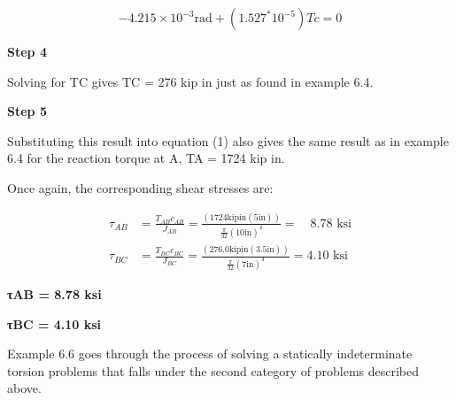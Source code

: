 \documentclass[
  letterpaper,
  DIV=11,
  numbers=noendperiod]{scrreprt}
\begin{document}
\begin{tcolorbox}
\begin{tcolorbox}
\[
-4.215 \times 10^{-3} \mathrm{rad}+(1.527^* 10^{-5}) T{c}=0
\]

\textbf{Step 4}

Solving for TC gives TC = 276 kip in just as found in example 6.4.

\textbf{Step 5}

Substituting this result into equation (1) also gives the same result as
in example 6.4 for the reaction torque at A, TA = 1724 kip in.

Once again, the corresponding shear stresses are:

\[
\begin{aligned}
\tau_{A B} & =\frac{T_{A B} c_{A B}}{J_{A B}}=\frac{(1724 \mathrm{kip} \mathrm{in}(5 \mathrm{in}))}{\frac{\pi}{32}(10 \mathrm{in})^4}=\quad 8.78 \text{ ksi} \\
\tau_{B C} & =\frac{T_{B C} c_{B C}}{J_{B C}}=\frac{(276.0 \mathrm{kip} \mathrm{in}(3.5 \mathrm{in}))}{\frac{\pi}{32}(7 \mathrm{in})^4}=4.10 \text{ ksi}
\end{aligned}
\]

\textbf{τAB = 8.78 ksi}

\textbf{τBC = 4.10 ksi}

\end{tcolorbox}

\end{tcolorbox}

Example 6.6 goes through the process of solving a statically
indeterminate torsion problems that falls under the second category of
problems described above.
\end{document}
